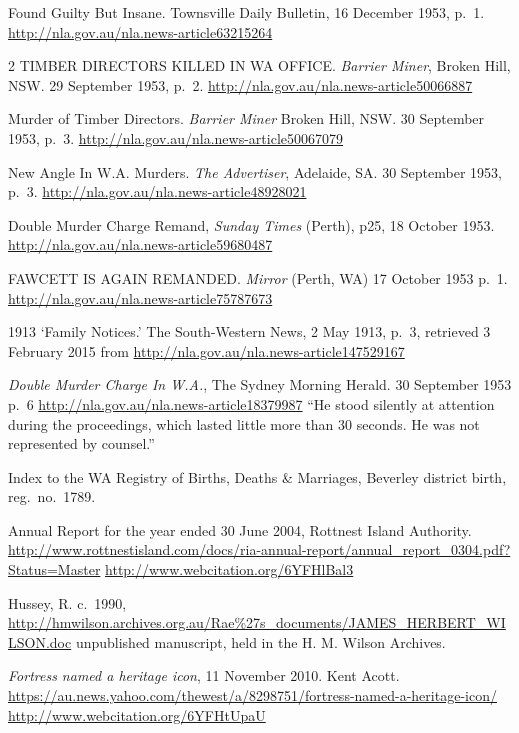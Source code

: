 \begin{thebibliography}{999}
	Found Guilty But Insane. Townsville Daily Bulletin, 16 December 1953, p.\ 1.
	\url{http://nla.gov.au/nla.news-article63215264}

	 2 TIMBER DIRECTORS KILLED IN WA OFFICE. \emph{Barrier Miner}, Broken Hill, NSW. 29 September 1953, p.\ 2.
	 \url{http://nla.gov.au/nla.news-article50066887}

	Murder of Timber Directors. \emph{Barrier Miner} Broken Hill, NSW. 30 September 1953, p.\ 3.
	\url{http://nla.gov.au/nla.news-article50067079}

	New Angle In W.A. Murders. \emph{The Advertiser}, Adelaide, SA. 30 September 1953, p.\ 3.
	\url{http://nla.gov.au/nla.news-article48928021}

	Double Murder Charge Remand, \emph{Sunday Times} (Perth), p25, 18 October 1953.
	\url{http://nla.gov.au/nla.news-article59680487}

	FAWCETT IS AGAIN REMANDED. \emph{Mirror} (Perth, WA) 17 October 1953 p.\ 1.
	\url{http://nla.gov.au/nla.news-article75787673}

	1913 `Family Notices.' The South-Western News, 2 May 1913, p.~3,
	retrieved 3 February 2015 from \url{http://nla.gov.au/nla.news-article147529167}

	\emph{Double Murder Charge In W.A.}, The Sydney Morning Herald. 30 September 1953 p.~6
	\url{http://nla.gov.au/nla.news-article18379987}
	``He stood silently at attention during the proceedings, which lasted little more than 30 seconds.
	He was not represented by counsel.''

	Index to the WA Registry of Births, Deaths \& Marriages, Beverley district birth, reg.~no.~1789.

	Annual Report for the year ended 30 June 2004, Rottnest Island Authority.
	\url{http://www.rottnestisland.com/docs/ria-annual-report/annual_report_0304.pdf?Status=Master}
	\url{http://www.webcitation.org/6YFHlBal3}

	Hussey, R. c.~1990, \url{http://hmwilson.archives.org.au/Rae\%27s_documents/JAMES_HERBERT_WILSON.doc}
	unpublished manuscript, held in the  H. M. Wilson Archives.

	\emph{Fortress named a heritage icon}, 11 November 2010. Kent Acott.
	\url{https://au.news.yahoo.com/thewest/a/8298751/fortress-named-a-heritage-icon/}
	\url{http://www.webcitation.org/6YFHtUpaU}


\end{thebibliography}
